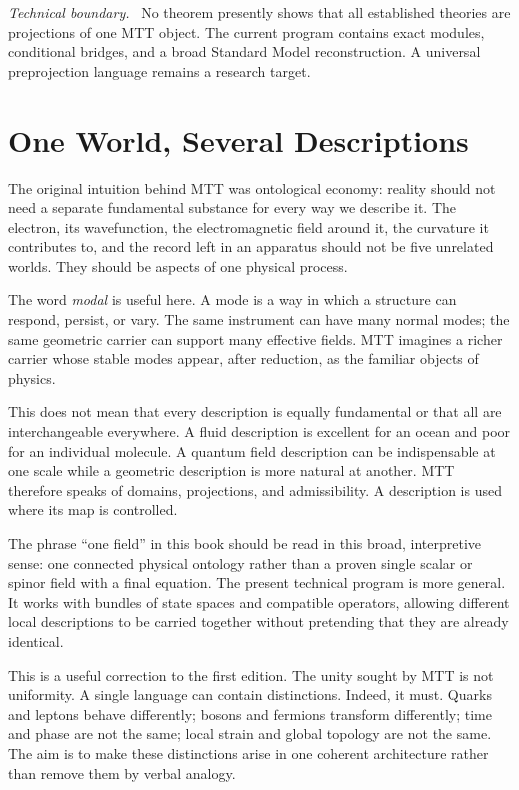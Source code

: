 \documentclass[11pt,openany]{book}
\newenvironment{technicalboundary}
  {\par\small\noindent\textit{Technical boundary.}\ }
  {\par}
\begin{document}
\begin{technicalboundary}
No theorem presently shows that all established theories are projections of
one MTT object. The current program contains exact modules, conditional
bridges, and a broad Standard Model reconstruction. A universal
preprojection language remains a research target.
\end{technicalboundary}

\chapter{One World, Several Descriptions}

The original intuition behind MTT was ontological economy: reality should not
need a separate fundamental substance for every way we describe it. The
electron, its wavefunction, the electromagnetic field around it, the
curvature it contributes to, and the record left in an apparatus should not
be five unrelated worlds. They should be aspects of one physical process.

The word \emph{modal} is useful here. A mode is a way in which a structure can
respond, persist, or vary. The same instrument can have many normal modes; the
same geometric carrier can support many effective fields. MTT imagines a
richer carrier whose stable modes appear, after reduction, as the familiar
objects of physics.

This does not mean that every description is equally fundamental or that all
are interchangeable everywhere. A fluid description is excellent for an
ocean and poor for an individual molecule. A quantum field description can
be indispensable at one scale while a geometric description is more natural
at another. MTT therefore speaks of domains, projections, and admissibility.
A description is used where its map is controlled.

The phrase ``one field'' in this book should be read in this broad,
interpretive sense: one connected physical ontology rather than a proven
single scalar or spinor field with a final equation. The present technical
program is more general. It works with bundles of state spaces and compatible
operators, allowing different local descriptions to be carried together
without pretending that they are already identical.

This is a useful correction to the first edition. The unity sought by MTT is
not uniformity. A single language can contain distinctions. Indeed, it must.
Quarks and leptons behave differently; bosons and fermions transform
differently; time and phase are not the same; local strain and global
topology are not the same. The aim is to make these distinctions arise in one
coherent architecture rather than remove them by verbal analogy.
\end{document}

